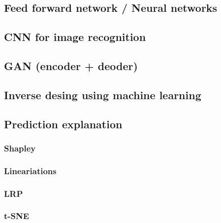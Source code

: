 \subsection{Feed forward network / Neural networks}
\subsection{CNN for image recognition}
\subsection{GAN (encoder + deoder)}
\subsection{Inverse desing using machine learning}
\subsection{Prediction explanation}
\subsubsection{Shapley}
\subsubsection{Lineariations}
\subsubsection{LRP}
\subsubsection{t-SNE}



